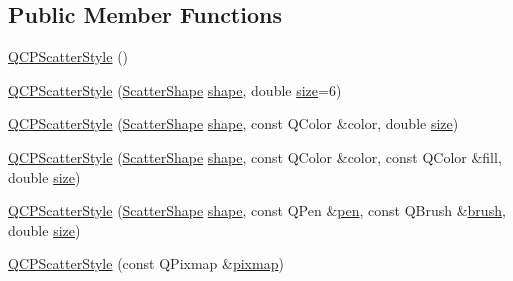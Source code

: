 \subsection*{Public Member Functions}
\begin{DoxyCompactItemize}
\item 
\mbox{\hyperlink{class_q_c_p_scatter_style_a8836018d9ad83ccd8870de8315c1be73}{Q\+C\+P\+Scatter\+Style}} ()
\item 
\mbox{\hyperlink{class_q_c_p_scatter_style_a003d92f74f4561eda111862eadd62f28}{Q\+C\+P\+Scatter\+Style}} (\mbox{\hyperlink{class_q_c_p_scatter_style_adb31525af6b680e6f1b7472e43859349}{Scatter\+Shape}} \mbox{\hyperlink{class_q_c_p_scatter_style_af04cad55bd7f58a96da4fc6bc46a0a1e}{shape}}, double \mbox{\hyperlink{class_q_c_p_scatter_style_a0e94526d9165d9f50e262102bdd71a47}{size}}=6)
\item 
\mbox{\hyperlink{class_q_c_p_scatter_style_afa059da858c864c7e05871dc602d7eab}{Q\+C\+P\+Scatter\+Style}} (\mbox{\hyperlink{class_q_c_p_scatter_style_adb31525af6b680e6f1b7472e43859349}{Scatter\+Shape}} \mbox{\hyperlink{class_q_c_p_scatter_style_af04cad55bd7f58a96da4fc6bc46a0a1e}{shape}}, const Q\+Color \&color, double \mbox{\hyperlink{class_q_c_p_scatter_style_a0e94526d9165d9f50e262102bdd71a47}{size}})
\item 
\mbox{\hyperlink{class_q_c_p_scatter_style_a6e1b64f12cac7f07af180ae4316fd38d}{Q\+C\+P\+Scatter\+Style}} (\mbox{\hyperlink{class_q_c_p_scatter_style_adb31525af6b680e6f1b7472e43859349}{Scatter\+Shape}} \mbox{\hyperlink{class_q_c_p_scatter_style_af04cad55bd7f58a96da4fc6bc46a0a1e}{shape}}, const Q\+Color \&color, const Q\+Color \&fill, double \mbox{\hyperlink{class_q_c_p_scatter_style_a0e94526d9165d9f50e262102bdd71a47}{size}})
\item 
\mbox{\hyperlink{class_q_c_p_scatter_style_a85acc4941d7e5c9bca5fa51377a77f49}{Q\+C\+P\+Scatter\+Style}} (\mbox{\hyperlink{class_q_c_p_scatter_style_adb31525af6b680e6f1b7472e43859349}{Scatter\+Shape}} \mbox{\hyperlink{class_q_c_p_scatter_style_af04cad55bd7f58a96da4fc6bc46a0a1e}{shape}}, const Q\+Pen \&\mbox{\hyperlink{class_q_c_p_scatter_style_acdd6313d16e69d3810e9d1f48dd9e4bb}{pen}}, const Q\+Brush \&\mbox{\hyperlink{class_q_c_p_scatter_style_adc4f66aed84f1d7a3a5aabf4f48f31a6}{brush}}, double \mbox{\hyperlink{class_q_c_p_scatter_style_a0e94526d9165d9f50e262102bdd71a47}{size}})
\item 
\mbox{\hyperlink{class_q_c_p_scatter_style_a63962094587a4c2258435aa7933996cc}{Q\+C\+P\+Scatter\+Style}} (const Q\+Pixmap \&\mbox{\hyperlink{class_q_c_p_scatter_style_a9b2d1a2ec0aac0c74f7582d14050e93a}{pixmap}})

\end{DoxyCompactItemize}
